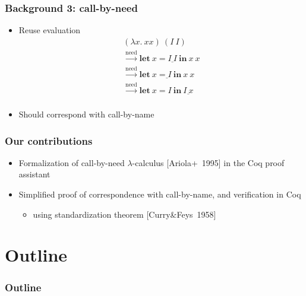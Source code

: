 \documentclass[dvipdfmx,cjk,xcolor=dvipsnames,envcountsect,notheorems,12pt]{beamer}
\theoremstyle{definition}
\newcommand{\LET}[3]{\mathbf{let}~#1=#2~\mathbf{in}~#3}
\newcommand{\CALLBYNEED}{\xrightarrow{\mathrm{need}}}
\begin{document}
\begin{frame}
	\frametitle{Background 3: call-by-need}
	\begin{itemize}
		\item Reuse evaluation
			\[\begin{array}{l}
				(\lambda x.~xx)~(I~I) \\
				\CALLBYNEED \LET{x}{\underline{I~I}}{x~x} \\
				\CALLBYNEED \underline{\LET{x}{I}{x~x}} \\
				\CALLBYNEED \LET{x}{I}{\underline{I~x}} \\
			\end{array}\]
		\item Should correspond with call-by-name
	\end{itemize}
\end{frame}

\begin{frame}
	\frametitle{Our contributions}
	\begin{itemize}
		\item Formalization of call-by-need $\lambda$-calculus \mbox{[Ariola+ 1995]} in the Coq proof assistant
		\vfill
		\item \alert{Simplified proof} of correspondence with call-by-name, and verification in Coq
			\begin{itemize}
				\item using standardization theorem \mbox{[Curry\&Feys 1958]}
			\end{itemize}
	\end{itemize}
\end{frame}

\section*{Outline}
\begin{frame}
  \frametitle{Outline}
	\begin{center}
		\begin{minipage}{.9\textwidth}
			\tableofcontents[sectionstyle=show,subsectionstyle=hide]
		\end{minipage}
	\end{center}
\end{frame}
\end{document}
